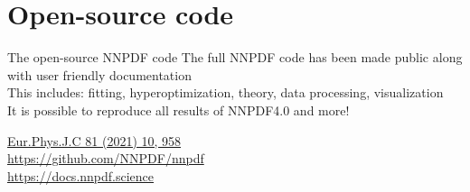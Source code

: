 \documentclass[aspectratio=169,9pt]{beamer}
\begin{document}
\section{Open-source code}
\begin{frame}[t]{The open-source NNPDF code}
    The full NNPDF code has been made public along with user friendly documentation\\
    \vspace*{1em}
    This includes: fitting, hyperoptimization, theory, data processing, visualization\\
    \vspace*{1em}
    It is possible to reproduce all results of NNPDF4.0 and more!\\
    \vspace*{2em}
    \begin{block}{}
        \centering
		\href{https://link.springer.com/article/10.1140/epjc/s10052-021-09747-9}{Eur.Phys.J.C 81 (2021) 10, 958} \\
		\url{https://github.com/NNPDF/nnpdf} \\
		\url{https://docs.nnpdf.science}
    \end{block}
\end{frame}




\end{document}
